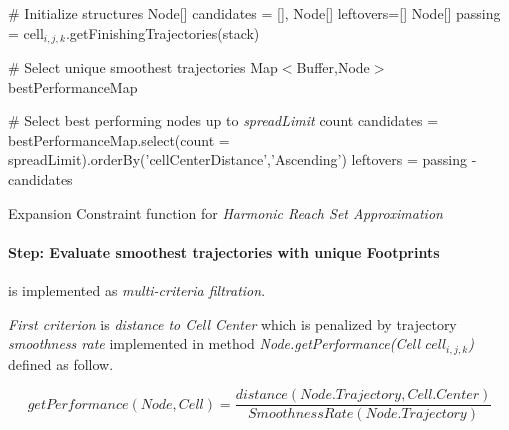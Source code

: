 \begin{algorithm}[H]
    
    \BlankLine
    \# Initialize structures\;
    Node[] candidates = [], Node[] leftovers=[]\;
    Node[] passing = cell$_{i,j,k}$.getFinishingTrajectories(stack)\;
    
    \BlankLine
    \# Select unique smoothest trajectories\;
    Map$<$Buffer,Node$>$  bestPerformanceMap\;
    \For{Node test $\in$ passing}{
        centerDistance= test.getPerformance(cell$_{i,j,k}$)]\;
        footPrint = test.getFootprint()\;
        \eIf{bestPerformanceMap.contains(footPrint)}{
            old = bestPerformanceMap.getByKey(footprint)\;
            oldPerformance= old.getPerformance(cell$_{i,j,k}$)\;
            \If{oldPerformance $>$ centerDistance}{
                bestPerformanceMap.setByKey(footprint,test)\;         
            }
        }{
            bestPerformanceMap.setByKey(footprint,test)\;
        }
    }
    
    \BlankLine
    \# Select best performing nodes up to \emph{spreadLimit} count\;
    candidates = bestPerformanceMap.select(count = spreadLimit).orderBy('cellCenterDistance','Ascending')\;
    leftovers = passing - candidates\;
    
    
    \caption{Expansion Constraint function for \emph{Harmonic Reach Set Approximation}}
    \label{alg:ExpansionConstraintFunctionForHarmonicReachSet}    
\end{algorithm}

\paragraph{Step: Evaluate smoothest trajectories with unique Footprints} is implemented as \emph{multi-criteria filtration}. 

\emph{First criterion} is \emph{distance to Cell Center} which is penalized by trajectory \emph{smoothness rate} implemented in method \emph{Node.getPerformance(Cell $cell_{i,j,k}$)} defined as follow.

\begin{equation}
    getPerformance(Node,Cell) = \frac{distance(Node.Trajectory,Cell.Center)}{SmoothnessRate(Node.Trajectory)}
\end{equation}

